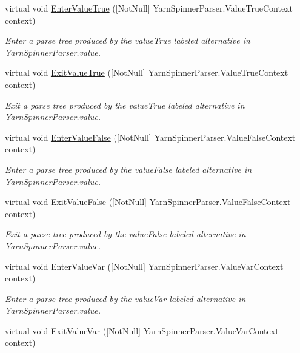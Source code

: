 \begin{DoxyCompactItemize}
virtual void \hyperlink{a00190_a37726e9d5de13df5a1ff987bca4cbd50}{Enter\-Value\-True} (\mbox{[}Not\-Null\mbox{]} Yarn\-Spinner\-Parser.\-Value\-True\-Context context)
\begin{DoxyCompactList}\small\item\em Enter a parse tree produced by the {\ttfamily value\-True} labeled alternative in Yarn\-Spinner\-Parser.\-value. \end{DoxyCompactList}\item 
virtual void \hyperlink{a00190_aa93e3f3a8f522d20d559f2b66bf780ce}{Exit\-Value\-True} (\mbox{[}Not\-Null\mbox{]} Yarn\-Spinner\-Parser.\-Value\-True\-Context context)
\begin{DoxyCompactList}\small\item\em Exit a parse tree produced by the {\ttfamily value\-True} labeled alternative in Yarn\-Spinner\-Parser.\-value. \end{DoxyCompactList}\item 
virtual void \hyperlink{a00190_ac84fd7ce4eec5de621fb041b1a863014}{Enter\-Value\-False} (\mbox{[}Not\-Null\mbox{]} Yarn\-Spinner\-Parser.\-Value\-False\-Context context)
\begin{DoxyCompactList}\small\item\em Enter a parse tree produced by the {\ttfamily value\-False} labeled alternative in Yarn\-Spinner\-Parser.\-value. \end{DoxyCompactList}\item 
virtual void \hyperlink{a00190_abb1e92cab5c21a27d277f4f77b50b42a}{Exit\-Value\-False} (\mbox{[}Not\-Null\mbox{]} Yarn\-Spinner\-Parser.\-Value\-False\-Context context)
\begin{DoxyCompactList}\small\item\em Exit a parse tree produced by the {\ttfamily value\-False} labeled alternative in Yarn\-Spinner\-Parser.\-value. \end{DoxyCompactList}\item 
virtual void \hyperlink{a00190_ab40a73dd590aa5e9081a131291fd4801}{Enter\-Value\-Var} (\mbox{[}Not\-Null\mbox{]} Yarn\-Spinner\-Parser.\-Value\-Var\-Context context)
\begin{DoxyCompactList}\small\item\em Enter a parse tree produced by the {\ttfamily value\-Var} labeled alternative in Yarn\-Spinner\-Parser.\-value. \end{DoxyCompactList}\item 
virtual void \hyperlink{a00190_ad03e275623c6693c7de931d3f3323f6c}{Exit\-Value\-Var} (\mbox{[}Not\-Null\mbox{]} Yarn\-Spinner\-Parser.\-Value\-Var\-Context context)

\end{DoxyCompactItemize}
